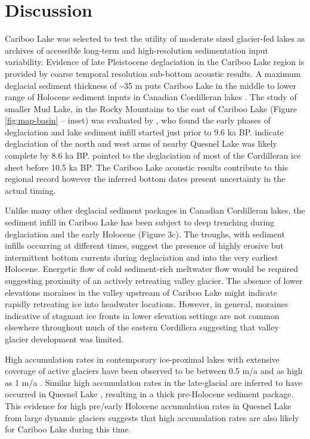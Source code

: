 \documentclass[Royal,times,doublespace,sageh]{sagej}
\begin{document}
\hypertarget{discussion}{%
\section{Discussion}\label{discussion}}

Cariboo Lake was selected to test the utility of moderate sized
glacier-fed lakes as archives of accessible long-term and
high-resolution sedimentation input variability. Evidence of late
Pleistocene deglaciation in the Cariboo Lake region is provided by
coarse temporal resolution sub-bottom acoustic results. A maximum
deglacial sediment thickness of \textasciitilde35 m puts Cariboo Lake in
the middle to lower range of Holocene sediment inputs in Canadian
Cordilleran lakes \citep[see detailed discussion in][]{Gilbert2012}. The
study of smaller Mud Lake, in the Rocky Mountains to the east of Cariboo
Lake (Figure \ref{fig:map-basin} -- inset) was evaluated by
\citet{Hodder2006}, who found the early phases of deglaciation and lake
sediment infill started just prior to 9.6 ka BP. \citet{Gilbert2012}
indicate deglaciation of the north and west arms of nearby Quesnel Lake
was likely complete by 8.6 ka BP. \citet{Menounos2009b} pointed to the
deglaciation of most of the Cordilleran ice sheet before 10.5 ka BP. The
Cariboo Lake acoustic results contribute to this regional record however
the inferred bottom dates present uncertainty in the actual timing.

Unlike many other deglacial sediment packages in Canadian Cordilleran
lakes, the sediment infill in Cariboo Lake has been subject to deep
trenching during deglaciation and the early Holocene (Figure 3c). The
troughs, with sediment infills occurring at different times, suggest the
presence of highly erosive but intermittent bottom currents during
deglaciation and into the very earliest Holocene. Energetic flow of cold
sediment-rich meltwater flow would be required suggesting proximity of
an actively retreating valley glacier. The absence of lower elevations
moraines in the valley upstream of Cariboo Lake might indicate rapidly
retreating ice into headwater locations. However, in general, moraines
indicative of stagnant ice fronts in lower elevation settings are not
common elsewhere throughout much of the eastern Cordillera suggesting
that valley glacier development was limited.

High accumulation rates in contemporary ice-proximal lakes with
extensive coverage of active glaciers have been observed to be between
0.5 m/a \citep{Crookshanks2008} and as high as 1 m/a
\citep{Gilbert1997}. Similar high accumulation rates in the late-glacial
are inferred to have occurred in Quesnel Lake \citep{Gilbert2012},
resulting in a thick pre-Holocene sediment package. This evidence for
high pre/early Holocene accumulation rates in Quesnel Lake from large
dynamic glaciers suggests that high accumulation rates are also likely
for Cariboo Lake during this time.
\end{document}
